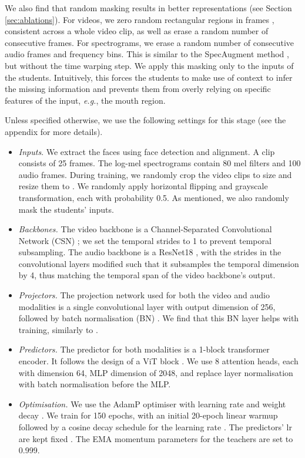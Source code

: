 \documentclass[10pt,twocolumn,letterpaper]{article}
\begin{document}
\begin{description}[wide,itemindent=\labelsep]
\item[Random masking.] We also find that random masking results in better representations (see Section \ref{sec:ablations}). For videos, we zero random rectangular regions in frames \cite{zhong2020random}, consistent across a whole video clip, as well as erase a random number of consecutive frames. For spectrograms, we erase a random number of consecutive audio frames and frequency bins. This is similar to the SpecAugment method \cite{park2019specaugment}, but without the time warping step. We apply this masking only to the inputs of the students. Intuitively, this forces the students to make use of context to infer the missing information and prevents them from overly relying on specific features of the input, \textit{e.g.}, the mouth region.

\item[Implementation details.] Unless specified otherwise, we use the following settings for this stage (see the appendix for more details).
\begin{itemize}[leftmargin=*]
    \item \textit{Inputs}. We extract the faces using face detection and alignment. A clip consists of 25 frames. The log-mel spectrograms contain 80 mel filters and 100 audio frames. During training, we randomly crop the video clips to size  and resize them to . We randomly apply horizontal flipping and grayscale transformation, each with probability 0.5. As mentioned, we also randomly mask the students' inputs.
    \item \textit{Backbones.} The video backbone is a Channel-Separated Convolutional Network (CSN) \cite{tran2019video}; we set the temporal strides to 1 to prevent temporal subsampling. The audio backbone is a ResNet18 \cite{he2016deep}, with the strides in the convolutional layers modified such that it subsamples the temporal dimension by 4, thus matching the temporal span of the video backbone's output.
    \item \textit{Projectors.} The projection network used for both the video and audio modalities is a single  convolutional layer with output dimension of 256, followed by batch normalisation (BN) \cite{ioffe2015batch}.  We find that this BN layer helps with training, similarly to \cite{chen2021exploring}.
    \item \textit{Predictors.} The predictor for both modalities is a 1-block transformer encoder. It follows the design of a ViT block \cite{dosovitskiy2020image}. We use 8 attention heads, each with dimension 64, MLP dimension of 2048, and replace layer normalisation \cite{ba2016layer} with batch normalisation \cite{ioffe2015batch} before the MLP.
    \item \textit{Optimisation.} We use the AdamP optimiser \cite{heo2020adamp} with learning rate  and weight decay . We train for 150 epochs, with an initial 20-epoch linear warmup followed by a cosine decay schedule for the learning rate \cite{loshchilov2016sgdr}. The predictors' lr are kept fixed \cite{chen2021exploring}. The EMA momentum parameters for the teachers are set to 0.999.
\end{itemize}



\end{description}
\end{document}
